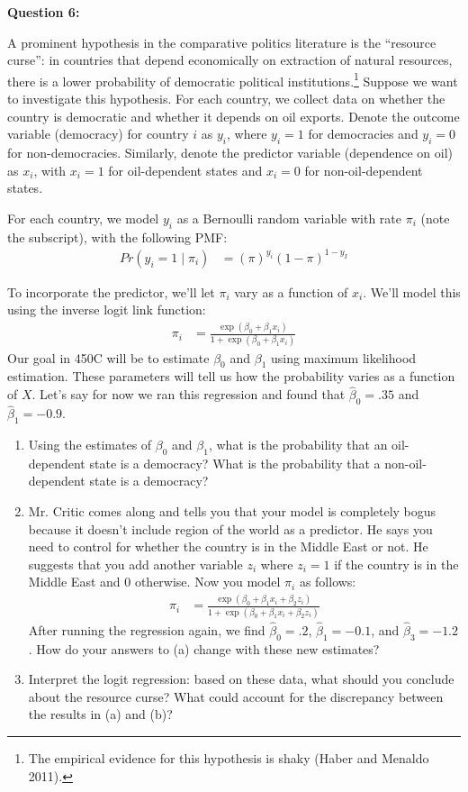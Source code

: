 \documentclass[11pt]{article}
\begin{document}
\bigskip

\textbf{Question 6:}

A prominent hypothesis in the comparative politics literature is the ``resource curse'': in countries that depend economically on extraction of natural resources, there is a lower probability of democratic political institutions.\footnote{The empirical evidence for this hypothesis is shaky (Haber and Menaldo 2011).} Suppose we  want to investigate this hypothesis. For each country, we collect data on whether the country is democratic and whether it depends on oil exports. Denote the outcome variable (democracy) for country $i$ as $y_i$, where $y_i = 1$ for democracies and $y_i  = 0$ for non-democracies. Similarly, denote the predictor variable (dependence on oil) as $x_i$, with $x_i = 1$ for oil-dependent states and $x_i = 0$ for non-oil-dependent states.

For each country, we model $y_i$ as a Bernoulli random variable with rate $\pi_i$ (note the subscript), with the following PMF:
\begin{align*}
Pr(y_i = 1 \mid \pi_i) &= (\pi)^{y_i} (1 - \pi)^{1-y_I}
\end{align*}

To incorporate the predictor, we'll let $\pi_i$ vary as a function of $x_i$. We'll model this using the inverse logit link function:
\begin{align*}
\pi_i &= \frac{\exp(\beta_0 + \beta_1 x_i)}{1 + \exp(\beta_0 +\beta_1 x_i)}
\end{align*}
Our goal in 450C will be to estimate $\beta_0$ and $\beta_1$ using maximum likelihood estimation. These parameters will tell us how the probability varies as a function of $X$. Let's say for now we ran this regression and found that $\hat\beta_0 = .35$ and $\hat\beta_1 = -0.9$. 

\begin{enumerate}
	\item Using the estimates of $\beta_0$ and $\beta_1$, what is the probability that an oil-dependent state is a democracy? What is the probability that a non-oil-dependent state is a democracy?
	\item Mr. Critic comes along and tells you that your model is completely bogus because it doesn't include region of the world as a predictor. He says you need to control for whether the country is in the Middle East or not. He suggests that you add another variable $z_i$ where $z_i = 1$ if the country is in the Middle East and 0 otherwise. Now you model $\pi_i$ as follows:
	\begin{align*}
	\pi_i &= \frac{\exp(\beta_0 + \beta_1 x_i + \beta_2 z_i )}{1 + \exp(\beta_0 +  \beta_1 x_i + \beta_2 z_i )}
	\end{align*}
	After running the regression again, we find $\hat{\beta}_0 = .2$, $\hat\beta_1 = -0.1$, and $\hat{\beta}_3 = -1.2$. How do your answers to (a) change with these new estimates? 
	\item Interpret the logit regression: based on these data, what should you conclude about the resource curse? What could account for the discrepancy between the results in (a) and (b)? 
\end{enumerate}
\end{document}
